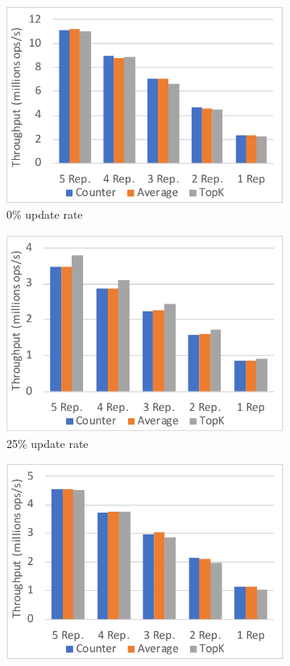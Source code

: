 \documentclass{vldb}
\begin{document}
\begin{figure}
	\centering
	\begin{subfigure}{.33\linewidth}
		\centering
		\includegraphics[width=.97\linewidth]{CounterAvgTopK0upd_v2_cut}
		\caption{0\% update rate}
		\label{fig:CounterAvgTopK0upd}
	\end{subfigure}%
	\begin{subfigure}{.33\linewidth}
		\centering
		\includegraphics[width=.97\linewidth]{CounterAvgTopK25upd_v2_cut}
		\caption{25\% update rate}
		\label{fig:CounterAvgTopK25upd}
	\end{subfigure}%
	\begin{subfigure}{.33\linewidth}
		\centering
		\includegraphics[width=.97\linewidth]{CounterAvgTopK100upd_v2_cut}

\end{subfigure}
\end{figure}
\end{document}
